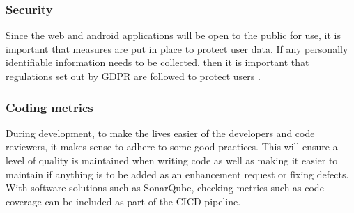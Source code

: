 \subsubsection{Security}
Since the web and android applications will be open to the public for use, it is important that measures are put in place to protect user data. 
If any personally identifiable information needs to be collected, then it is important that regulations set out by GDPR are followed to 
protect users \cite{eu2016gdpr}.

\subsubsection{Coding metrics}
During development, to make the lives easier of the developers and code reviewers, it makes sense to adhere to some good practices. 
This will ensure a level of quality is maintained when writing code as well as making it easier to maintain if anything is to be added as an 
enhancement request or fixing defects. 
With software solutions such as SonarQube, checking metrics such as code coverage can be included as part of the CICD pipeline.

